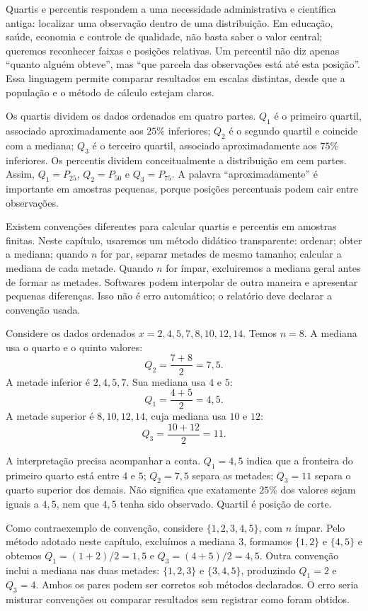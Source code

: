 Quartis e percentis respondem a uma necessidade administrativa e científica antiga: localizar uma observação dentro de uma distribuição. Em educação, saúde, economia e controle de qualidade, não basta saber o valor central; queremos reconhecer faixas e posições relativas. Um percentil não diz apenas ``quanto alguém obteve'', mas ``que parcela das observações está até esta posição''. Essa linguagem permite comparar resultados em escalas distintas, desde que a população e o método de cálculo estejam claros.

Os quartis dividem os dados ordenados em quatro partes. $Q_1$ é o primeiro quartil, associado aproximadamente aos $25\%$ inferiores; $Q_2$ é o segundo quartil e coincide com a mediana; $Q_3$ é o terceiro quartil, associado aproximadamente aos $75\%$ inferiores. Os percentis dividem conceitualmente a distribuição em cem partes. Assim, $Q_1=P_{25}$, $Q_2=P_{50}$ e $Q_3=P_{75}$. A palavra ``aproximadamente'' é importante em amostras pequenas, porque posições percentuais podem cair entre observações.

Existem convenções diferentes para calcular quartis e percentis em amostras finitas. Neste capítulo, usaremos um método didático transparente: ordenar; obter a mediana; quando $n$ for par, separar metades de mesmo tamanho; calcular a mediana de cada metade. Quando $n$ for ímpar, excluiremos a mediana geral antes de formar as metades. Softwares podem interpolar de outra maneira e apresentar pequenas diferenças. Isso não é erro automático; o relatório deve declarar a convenção usada.

Considere os dados ordenados $x={2,4,5,7,8,10,12,14}$. Temos $n=8$. A mediana usa o quarto e o quinto valores:
\[
Q_2=\frac{7+8}{2}=7{,}5.
\]
A metade inferior é ${2,4,5,7}$. Sua mediana usa $4$ e $5$:
\[
Q_1=\frac{4+5}{2}=4{,}5.
\]
A metade superior é ${8,10,12,14}$, cuja mediana usa $10$ e $12$:
\[
Q_3=\frac{10+12}{2}=11.
\]

A interpretação precisa acompanhar a conta. $Q_1=4{,}5$ indica que a fronteira do primeiro quarto está entre $4$ e $5$; $Q_2=7{,}5$ separa as metades; $Q_3=11$ separa o quarto superior dos demais. Não significa que exatamente $25\%$ dos valores sejam iguais a $4{,}5$, nem que $4{,}5$ tenha sido observado. Quartil é posição de corte.

Como contraexemplo de convenção, considere $\{1,2,3,4,5\}$, com $n$ ímpar. Pelo método adotado neste capítulo, excluímos a mediana $3$, formamos $\{1,2\}$ e $\{4,5\}$ e obtemos $Q_1=(1+2)/2=1{,}5$ e $Q_3=(4+5)/2=4{,}5$. Outra convenção inclui a mediana nas duas metades: $\{1,2,3\}$ e $\{3,4,5\}$, produzindo $Q_1=2$ e $Q_3=4$. Ambos os pares podem ser corretos sob métodos declarados. O erro seria misturar convenções ou comparar resultados sem registrar como foram obtidos.

